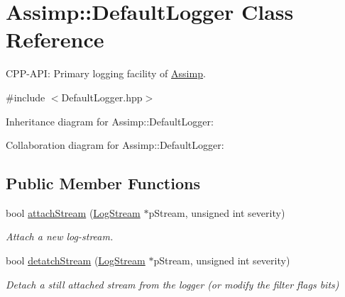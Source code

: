 \hypertarget{class_assimp_1_1_default_logger}{\section{Assimp\+:\+:Default\+Logger Class Reference}
\label{class_assimp_1_1_default_logger}
}


C\+P\+P-\/\+A\+P\+I\+: Primary logging facility of \hyperlink{class_assimp}{Assimp}.  




{\ttfamily \#include $<$Default\+Logger.\+hpp$>$}



Inheritance diagram for Assimp\+:\+:Default\+Logger\+:


Collaboration diagram for Assimp\+:\+:Default\+Logger\+:
\subsection*{Public Member Functions}
\begin{DoxyCompactItemize}
\item 
bool \hyperlink{class_assimp_1_1_default_logger_abc0ca7a337f8c3e38eca0eb45bb1ccf0}{attach\+Stream} (\hyperlink{class_assimp_1_1_log_stream}{Log\+Stream} $\ast$p\+Stream, unsigned int severity)
\begin{DoxyCompactList}\small\item\em Attach a new log-\/stream. \end{DoxyCompactList}\item 
bool \hyperlink{class_assimp_1_1_default_logger_a2615f1d1624f1d742d0cf2dd4a5cccc8}{detatch\+Stream} (\hyperlink{class_assimp_1_1_log_stream}{Log\+Stream} $\ast$p\+Stream, unsigned int severity)
\begin{DoxyCompactList}\small\item\em Detach a still attached stream from the logger (or modify the filter flags bits) \end{DoxyCompactList}\end{DoxyCompactItemize}
